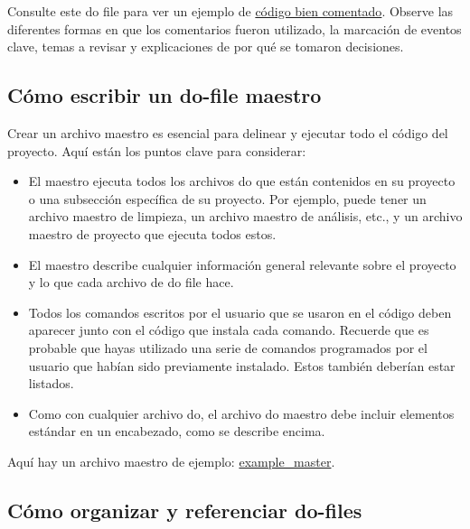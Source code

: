 \documentclass[11pt,en]{elegantpaper}
\begin{document}
Consulte este do file para ver un ejemplo de \href{http://www.poverty-action.org/research-transparency/example-code-comments}{código bien comentado}. Observe las diferentes formas en que los comentarios fueron utilizado, la marcación de eventos clave, temas a revisar y explicaciones de por qué se tomaron decisiones.

\subsection{Cómo escribir un do-file maestro}
\label{sec:domaestro}

Crear un archivo maestro es esencial para delinear y ejecutar todo el código del proyecto. Aquí están los puntos clave para
considerar:

\begin{itemize}
	\item El maestro ejecuta todos los archivos do que están contenidos en su proyecto o una subsección específica de su proyecto. Por ejemplo, puede tener un archivo maestro de limpieza, un archivo maestro de análisis, etc., y un archivo maestro de proyecto que ejecuta todos estos.
	
	\item El maestro describe cualquier información general relevante sobre el proyecto y lo que cada archivo de do file hace.
	
	\item Todos los comandos escritos por el usuario que se usaron en el código deben aparecer junto con el código que instala cada comando. Recuerde que es probable que hayas utilizado una serie de comandos programados por el  usuario que habían sido previamente instalado. Estos también deberían estar listados.
	
	\item Como con cualquier archivo do, el archivo do maestro debe incluir elementos estándar en un encabezado, como se describe encima.
\end{itemize}

Aquí hay un archivo maestro de ejemplo: \href{http://www.poverty-action.org/research-transparency/example-master}{example\_master}.

\subsection{Cómo organizar y referenciar do-files}
\label{sec:doorganizar}
\end{document}
